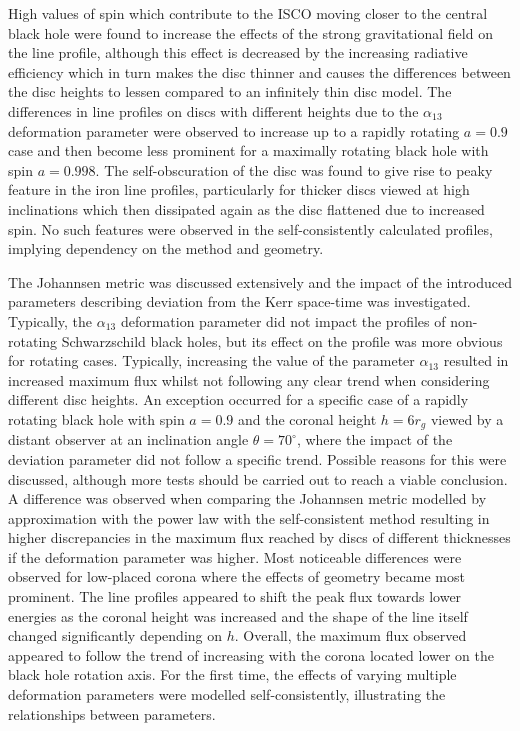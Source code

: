 \documentclass[fleqn,usenatbib,useAMS]{mnras}
\begin{document}
High values of spin which contribute to the ISCO moving closer to the central black hole were found to increase the effects of the strong gravitational field on the line profile, although this effect is decreased by the increasing radiative efficiency which in turn makes the disc thinner and causes the differences between the disc heights to lessen compared to an infinitely thin disc model. The differences in line profiles on discs with different heights due to the $\alpha_{13}$ deformation parameter were observed to increase up to a rapidly rotating $a = 0.9$ case and then become less prominent for a maximally rotating black hole with spin $a = 0.998$. The self-obscuration of the disc was found to give rise to peaky feature in the iron line profiles, particularly for thicker discs viewed at high inclinations which then dissipated again as the disc flattened due to increased spin. No such features were observed in the self-consistently calculated profiles, implying dependency on the method and geometry. 

The Johannsen metric was discussed extensively and the impact of the introduced parameters describing deviation from the Kerr space-time was investigated. Typically, the $\alpha_{13}$ deformation parameter did not impact the profiles of non-rotating Schwarzschild black holes, but its effect on the profile was more obvious for rotating cases. Typically, increasing the value of the parameter $\alpha_{13}$ resulted in increased maximum flux whilst not following any clear trend when considering different disc heights. An exception occurred for a specific case of a rapidly rotating black hole with spin $a = 0.9$ and the coronal height $h = 6 r_{g}$ viewed by a distant observer at an inclination angle $\theta = 70^{\circ}$, where the impact of the deviation parameter did not follow a specific trend. Possible reasons for this were discussed, although more tests should be carried out to reach a viable conclusion.
A difference was observed when comparing the Johannsen metric modelled by approximation with the power law with the self-consistent method resulting in higher discrepancies in the maximum flux reached by discs of different thicknesses if the deformation parameter was higher. Most noticeable differences were observed for low-placed corona where the effects of geometry became most prominent. The line profiles appeared to shift the peak flux towards lower energies as the coronal height was increased and the shape of the line itself changed significantly depending on $h$. Overall, the maximum flux observed appeared to follow the trend of increasing with the corona located lower on the black hole rotation axis. For the first time, the effects of varying multiple deformation parameters were modelled self-consistently, illustrating the relationships between parameters. 
\end{document}
